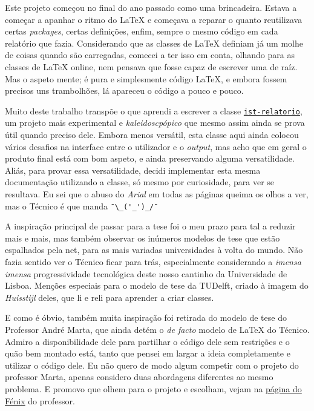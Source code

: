 \documentclass{ist-thesis}
\begin{document}
Este projeto começou no final do ano passado como uma brincadeira. Estava a começar a apanhar o ritmo do \LaTeX{} e começava a reparar o quanto reutilizava certas \textit{packages}, certas definições, enfim, sempre o mesmo código em cada relatório que fazia. Considerando que as classes de \LaTeX{} definiam já um molhe de coisas quando são carregadas, comecei a ter isso em conta, olhando para as classes de \LaTeX{} online, nem pensava que fosse capaz de escrever uma de raíz. Mas o aspeto mente; é pura e simplesmente código \LaTeX{}, e embora fossem precisos uns trambolhões, lá apareceu o código a pouco e pouco.

Muito deste trabalho transpõe o que aprendi a escrever a classe \href{https://github.com/ekspek/ist-relatorio}{\texttt{ist-relatorio}}, um projeto mais experimental e \textit{kaleidoscpópico} que mesmo assim ainda se prova útil quando preciso dele. Embora menos versátil, esta classe aqui ainda colocou vários desafios na interface entre o utilizador e o \textit{output}, mas acho que em geral o produto final está com bom aspeto, e ainda preservando alguma versatilidade. Aliás, para provar essa versatilidade, decidi implementar esta mesma documentação utilizando a classe, só mesmo por curiosidade, para ver se resultava. Eu sei que o abuso do \textit{Arial} em todas as páginas queima os olhos a ver, mas o Técnico é que manda \verb|¯\_('_')_/¯|

A inspiração principal de passar para a tese foi o meu prazo para tal a reduzir mais e mais, mas também observar os inúmeros modelos de tese que estão espalhados pela net, para as mais variadas universidades à volta do mundo. Não fazia sentido ver o Técnico ficar para trás, especialmente considerando a \textit{imensa imensa} progressividade tecnológica deste nosso cantinho da Universidade de Lisboa. Menções especiais para o modelo de tese da TUDelft, criado à imagem do \textit{Huisstijl} deles, que li e reli para aprender a criar classes.

E como é óbvio, também muita inspiração foi retirada do modelo de tese do Professor André Marta, que ainda detém o \textit{de facto} modelo de \LaTeX{} do Técnico. Admiro a disponibilidade dele para partilhar o código dele sem restrições e o quão bem montado está, tanto que pensei em largar a ideia completamente e utilizar o código dele. Eu não quero de modo algum competir com o projeto do professor Marta, apenas considero duas abordagens diferentes ao mesmo problema. E promovo que olhem para o projeto e escolham, vejam na \href{https://fenix.tecnico.ulisboa.pt/homepage/ist31052/documentos-para-elaboracao-da-tese}{página do Fénix} do professor.
\end{document}
